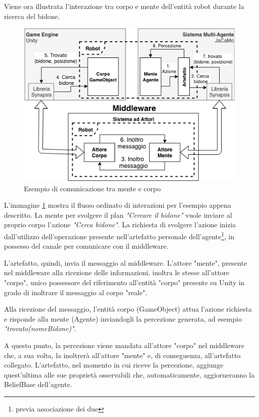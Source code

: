 Viene ora illustrata l'interazione tra corpo e mente dell'entità robot durante la ricerca del bidone.

\begin{figure}[H]
\centering
\includegraphics[width=\textwidth]{figures/scenario_esempio.png}
\caption{Esempio di comunicazione tra mente e corpo}
\label{scenario_esempio}
\end{figure}

L'immagine \ref{scenario_esempio} mostra il flusso ordinato di interazioni per l'esempio appena descritto. La mente per svolgere il plan \textit{"Cercare il bidone"} vuole inviare al proprio corpo l'azione \textit{"Cerca bidone"}. La richiesta di svolgere l'azione inizia dall'utilizzo dell'operazione presente nell'artefatto personale dell'agente\footnote{previa associazione dei due}, in possesso del canale per comunicare con il middleware.

\medskip

L'artefatto, quindi, invia il messaggio al middleware. L’attore "mente", presente nel middleware alla ricezione delle informazioni, inoltra le stesse all'attore "corpo", unico possessore del riferimento all’entità "corpo" presente su Unity in grado di inoltrare il messaggio al corpo "reale".  

\medskip

Alla ricezione del messaggio, l'entità corpo (GameObject) attua l'azione richiesta e risponde alla mente (Agente) inviandogli la percezione generata, ad esempio \textit{"trovato(nomeBidone)"}.

\medskip

A questo punto, la percezione viene mandata all'attore "corpo" nel middleware che, a sua volta, la inoltrerà all'attore "mente" e, di conseguenza, all'artefatto collegato. L'artefatto, nel momento in cui riceve la percezione, aggiunge quest'ultima alle sue proprietà osservabili che, automaticamente, aggiorneranno la BeliefBase dell'agente. 

